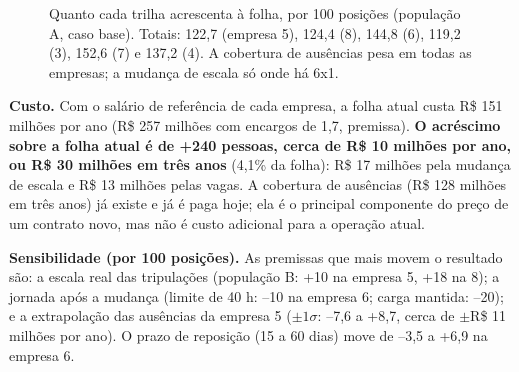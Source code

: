 \documentclass[11pt,a4paper]{article}
\begin{document}
\begin{figure}[htbp]
\centering
{}
\caption{Quanto cada trilha acrescenta à folha, por 100 posições (população A, caso base). Totais: 122,7 (empresa 5), 124,4 (8), 144,8 (6), 119,2 (3), 152,6 (7) e 137,2 (4). A cobertura de ausências pesa em todas as empresas; a mudança de escala só onde há 6x1.}
\end{figure}

\textbf{Custo.} Com o salário de referência de cada empresa, a folha atual custa R\$ 151 milhões por ano (R\$ 257 milhões com encargos de 1,7, premissa). \textbf{O acréscimo sobre a folha atual é de +240 pessoas, cerca de R\$ 10 milhões por ano, ou R\$ 30 milhões em três anos} (4,1\% da folha): R\$ 17 milhões pela mudança de escala e R\$ 13 milhões pelas vagas. A cobertura de ausências (R\$ 128 milhões em três anos) já existe e já é paga hoje; ela é o principal componente do preço de um contrato novo, mas não é custo adicional para a operação atual.

\textbf{Sensibilidade (por 100 posições).} As premissas que mais movem o resultado são: a escala real das tripulações (população B: +10 na empresa 5, +18 na 8); a jornada após a mudança (limite de 40 h: --10 na empresa 6; carga mantida: --20); e a extrapolação das ausências da empresa 5 ($\pm1\sigma$: --7,6 a +8,7, cerca de $\pm$R\$ 11 milhões por ano). O prazo de reposição (15 a 60 dias) move de --3,5 a +6,9 na empresa 6.
\end{document}
